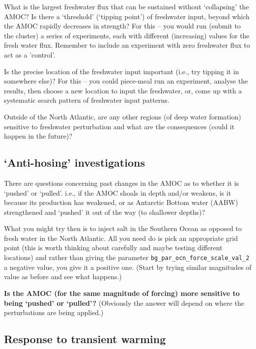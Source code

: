 What is the largest freshwater flux that can be sustained without ‘collapsing’ the AMOC? Is there a ‘threshold’ (‘tipping point’) of freshwater input, beyond which the AMOC rapidly decreases in strength? For this -- you would run (submit to the cluster) a series of experiments, each with different (increasing) values for the fresh water flux. Remember to include an experiment with zero freshwater flux to act as a 'control'.

Is the precise location of the freshwater input important (i.e., try tipping it in somewhere else)? For this -- you could piece-meal run an experiment, analyse the results, then choose a new location to input the freshwater, or, come up with a systematic search pattern of freshwater input patterns.  

Outside of the North Atlantic, are any other  regions (of deep water formation) sensitive to freshwater perturbation and what are the consequences (could it happen in the future)?


\subsection{‘Anti-hosing’ investigations}

There are questions concerning past changes in the AMOC as to whether it is ‘pushed’ or ‘pulled’. i.e., if the AMOC shoals in depth and/or weakens, is it because its production has weakened, or as Antarctic Bottom water (AABW) strengthened and ‘pushed’ it out of the way (to shallower depths)?

What you might try then is to inject salt in the Southern Ocean as opposed to fresh water in the North Atlantic. All you need do is pick an appropriate grid point (this is worth thinking about carefully and maybe testing different locations) and rather than giving the parameter \texttt{bg\_par\_ocn\_force\_scale\_val\_2} a negative value, you give it a positive one. (Start by trying similar magnitudes of value as before and see what happens.)

\textbf{Is the AMOC (for the same magnitude of forcing) more sensitive to being ‘pushed’ or ‘pulled’?} (Obviously the answer will  depend on where the perturbations are being applied.)


\subsection{Response to transient warming}


